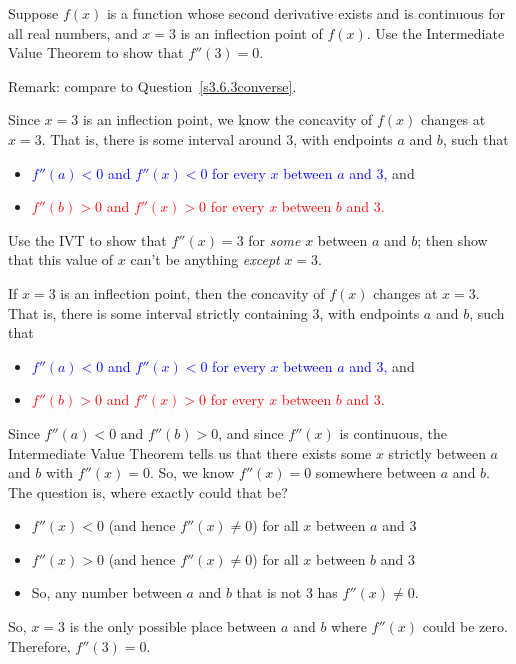 \begin{solution}
%
\end{solution}


\begin{question}\label{s3.6.3IVT}
Suppose $f(x)$ is a function whose second derivative exists and is continuous for all real numbers, and $x=3$ is an inflection point of $f(x)$. Use the Intermediate Value Theorem to show that $f''(3)=0$.

Remark: compare to Question~\ref{s3.6.3converse}.
\end{question}
\begin{hint}
Since $x=3$ is an inflection point, we know the concavity of $f(x)$ changes at $x=3$.
That is, there is some interval around 3, with endpoints $a$ and $b$, such that
\begin{itemize}
\item \textcolor{blue}{$f''(a)<0$ and $f''(x)<0$ for every $x$ between $a$ and 3,} and
\item \textcolor{red}{$f''(b)>0$ and $f''(x)>0$ for every $x$ between $b$ and 3.}
\end{itemize}
Use the IVT to show that $f''(x)=3$ for \emph{some} $x$ between $a$ and $b$; then show that this value of $x$ can't be anything \emph{except} $x=3$.
\end{hint}
\begin{answer}
If $x=3$ is an inflection point, then the concavity of $f(x)$ changes at $x=3$. That is, there is some interval strictly containing 3, with endpoints $a$ and $b$, such that
\begin{itemize}
\item \textcolor{blue}{$f''(a)<0$ and $f''(x)<0$ for every $x$ between $a$ and 3,} and
\item \textcolor{red}{$f''(b)>0$ and $f''(x)>0$ for every $x$ between $b$ and 3.}
\end{itemize}

Since $f''(a)<0$ and $f''(b)>0$, and since $f''(x)$ is continuous, the Intermediate Value Theorem tells us that there exists some $x$ strictly between $a$ and $b$ with $f''(x)=0$. So, we know $f''(x)=0$ somewhere between $a$ and $b$. The question is, where exactly could that be?

\begin{itemize}
\item $f''(x)<0$ (and hence $f''(x) \neq 0$) for all $x$ between $a$ and 3
\item $f''(x)>0$ (and hence $f''(x) \neq 0$)  for all $x$ between $b$ and 3
\item So, any number between $a$ and $b$ that is not 3 has $f''(x)\neq 0$.
\end{itemize}
So, $x=3$ is the only possible place between $a$ and $b$ where $f''(x)$ could be zero. Therefore, $f''(3)=0$.
\end{answer}
